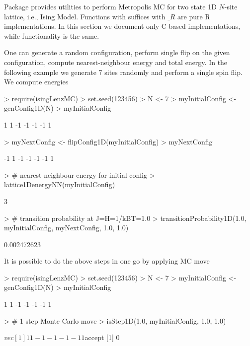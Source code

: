 \documentclass[a4paper]{article}
\begin{document}
Package provides utilities to perform Metropolis MC for two state 1D $N$-site lattice, i.e., Ising Model. Functions with suffices with 
$\_R$ are pure R implementations. In this section we document only C based implementations, while functionality is the same. 

One can generate a random configuration, perform single flip on the given configuration, compute nearest-neighbour energy and
total energy. In the following example we generate 7 sites randomly and perform a single spin flip. We compute energies

\begin{Schunk}
\begin{Sinput}
> require(isingLenzMC)
> set.seed(123456)
> N <- 7 
> myInitialConfig <- genConfig1D(N)
> myInitialConfig 
\end{Sinput}
\begin{Soutput}
[1]  1  1 -1 -1 -1 -1  1
\end{Soutput}
\begin{Sinput}
> myNextConfig    <- flipConfig1D(myInitialConfig)
> myNextConfig   
\end{Sinput}
\begin{Soutput}
[1] -1  1 -1 -1 -1 -1  1
\end{Soutput}
\begin{Sinput}
> # nearest neighbour energy for initial config
> lattice1DenergyNN(myInitialConfig) 
\end{Sinput}
\begin{Soutput}
[1] 3
\end{Soutput}
\begin{Sinput}
> # transition probability  at J=H=1/kBT=1.0
> transitionProbability1D(1.0, myInitialConfig, myNextConfig, 1.0, 1.0)
\end{Sinput}
\begin{Soutput}
[1] 0.002472623
\end{Soutput}
\end{Schunk}

It is possible to do the above steps in one go by applying MC move
\begin{Schunk}
\begin{Sinput}
> require(isingLenzMC)
> set.seed(123456)
> N <- 7 
> myInitialConfig <- genConfig1D(N)
> myInitialConfig
\end{Sinput}
\begin{Soutput}
[1]  1  1 -1 -1 -1 -1  1
\end{Soutput}
\begin{Sinput}
> # 1 step Monte Carlo move
> isStep1D(1.0, myInitialConfig, 1.0, 1.0)
\end{Sinput}
\begin{Soutput}
$vec
[1]  1  1 -1 -1 -1 -1  1

$accept
[1] 0
\end{Soutput}
\end{Schunk}
\end{document}
